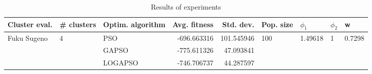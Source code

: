 \begin{table}
\centering
\caption{Results of experiments}
\begin{tabular}{lllrrllll}
\toprule
               Cluster eval. &        \# clusters & Optim. algorithm &  Avg. fitness &  Std. dev. &            Pop. size &               $\phi_{1}$ &         $\phi_{2}$ &                       w \\
\midrule
\multirow{3}{*}{Fuku Sugeno} & \multirow{3}{*}{4} &              PSO &   -696.663316 & 101.545946 & \multirow{3}{*}{100} & \multirow{3}{*}{1.49618} & \multirow{3}{*}{1} & \multirow{3}{*}{0.7298} \\
                             &                    &            GAPSO &   -775.611326 &  47.093841 &                      &                          &                    &                         \\
                             &                    &          LOGAPSO &   -746.706737 &  44.287597 &                      &                          &                    &                         \\
\bottomrule
\end{tabular}
\end{table}
